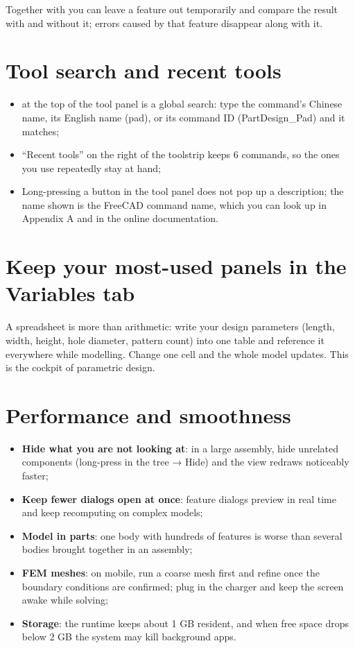 Together with  you can leave a feature out temporarily and compare the result with and without it;
errors caused by that feature disappear along with it.

\section{Tool search and recent tools}

\begin{itemize}
  \item {} at the top of the tool panel is a global search: type the command's Chinese name,
        its English name (pad), or its command ID (PartDesign\_Pad) and it matches;
  \item ``Recent tools'' on the right of the toolstrip keeps 6 commands, so the ones you use repeatedly stay at hand;
  \item Long-pressing a button in the tool panel does not pop up a description; the name shown is the FreeCAD command name,
        which you can look up in Appendix A and in the online documentation.
\end{itemize}

\section{Keep your most-used panels in the Variables tab}

A spreadsheet is more than arithmetic: write your design parameters (length, width, height, hole diameter,
pattern count) into one table and reference it everywhere while modelling. Change one cell and the whole
model updates. This is the cockpit of parametric design.

\section{Performance and smoothness}

\begin{itemize}
  \item \textbf{Hide what you are not looking at}: in a large assembly, hide unrelated components (long-press in the tree → Hide) and the view redraws noticeably faster;
  \item \textbf{Keep fewer dialogs open at once}: feature dialogs preview in real time and keep recomputing on complex models;
  \item \textbf{Model in parts}: one body with hundreds of features is worse than several bodies brought together in an assembly;
  \item \textbf{FEM meshes}: on mobile, run a coarse mesh first and refine once the boundary conditions are confirmed; plug in the charger and keep the screen awake while solving;
  \item \textbf{Storage}: the runtime keeps about 1 GB resident, and when free space drops below 2 GB the system may kill background apps.
\end{itemize}

